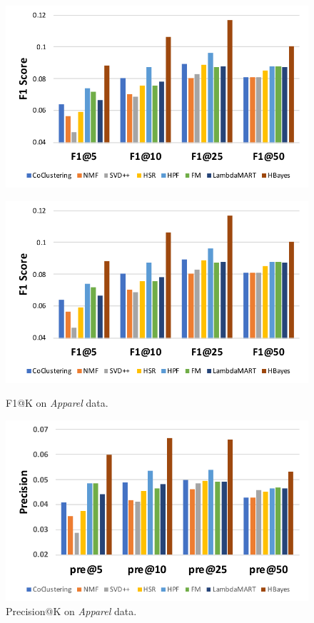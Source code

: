 \begin{figure}[!htb]
\includegraphics[width=0.7\linewidth]{fig/legend}
\end{figure}

\begin{figure}[!htb]
  \includegraphics[width=\linewidth]{fig/F1-score_jd}
  \caption{F1@K on \emph{Apparel} data.}\label{fig:awesome_image1}
\endminipage\hfill
{}
  \includegraphics[width=\linewidth]{fig/precision_jd}
  \caption{Precision@K on \emph{Apparel} data.}\label{fig:awesome_image2}

\end{figure}
